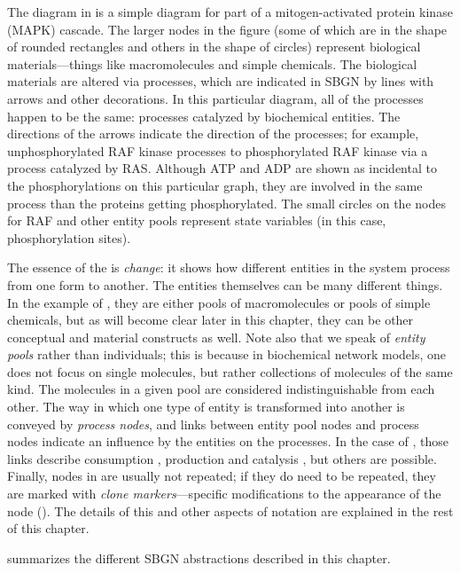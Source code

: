 The diagram in  is a simple diagram for part of a mitogen-activated protein kinase (MAPK) cascade.  The larger nodes in the figure (some of which are in the shape of rounded rectangles and others in the shape of circles) represent biological materials---things like macromolecules and simple chemicals.  The biological materials are altered via processes, which are indicated in SBGN by lines with arrows and other decorations.  In this particular diagram, all of the processes happen to be the same: processes catalyzed by biochemical entities.  The directions of the arrows indicate the direction of the processes; for example, unphosphorylated RAF kinase processes to phosphorylated RAF kinase via a process catalyzed by RAS. Although ATP and ADP are shown as incidental to the phosphorylations on this particular graph, they are involved in the same process than the proteins getting phosphorylated. The small circles on the nodes for RAF and other entity pools represent state variables (in this case, phosphorylation sites). 

The essence of the \PD is \emph{change}: it shows how different entities in the system process from one form to another.  The entities themselves can be many different things.  In the example of , they are either pools of macromolecules or pools of simple chemicals, but as will become clear later in this chapter, they can be other conceptual and material constructs as well.  Note also that we speak of \emph{entity pools} rather than individuals; this is because in biochemical network models, one does not focus on single molecules, but rather collections of molecules of the same kind.  The molecules in a given pool are considered indistinguishable from each other.  The way in which one type of entity is transformed into another is conveyed by \emph{process nodes}, and links between entity pool nodes and process nodes indicate an influence by the entities on the processes.  In the case of , those links describe consumption , production  and catalysis , but others are possible.  Finally, nodes in \PDs are usually not repeated; if they do need to be repeated, they are marked with \emph{clone markers}---specific modifications to the appearance of the node (). The details of this and other aspects of \PD notation are explained in the rest of this chapter.

 summarizes the different SBGN abstractions described in this chapter.

